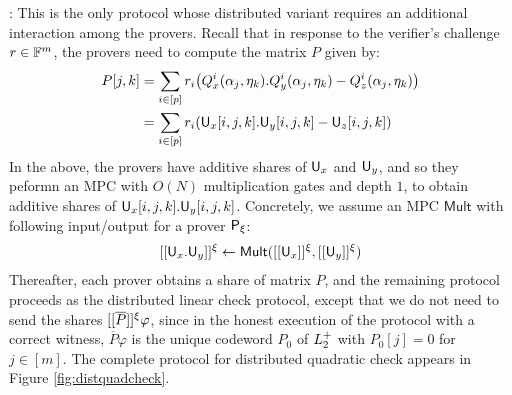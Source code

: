 : This is the only protocol whose
distributed variant requires an additional interaction among the provers. Recall
that in response to the verifier's challenge $r\in \mathbb{F}^m$, the provers need to
compute the matrix $P$ given by: 
\begin{align*}
P[j,k] & =\sum_{i\in
[p]}r_i\big(Q_x^i(\alpha_j,\eta_k).Q_y^i(\alpha_j,\eta_k)-Q_z^i(\alpha_j,\eta_k)\big)
\\
& = \sum_{i\in [p]}r_i(\mathsf{U}_x[i,j,k].\mathsf{U}_y[i,j,k] - \mathsf{U}_z[i,j,k])
\end{align*}
In the above, the provers have additive shares of $\mathsf{U}_x$ and $\mathsf{U}_y$, and
so they peformn an MPC with $O(N)$ multiplication gates and depth $1$, to obtain additive shares of
$\mathsf{U}_x[i,j,k].\mathsf{U}_y[i,j,k]$. Concretely, we assume an MPC $\mathsf{Mult}$
with following input/output for a prover $\mathsf{P}_\xi$: 
\begin{align*}
[[{\mathsf{U}_x.\mathsf{U}_y}]]^\xi\leftarrow \mathsf{Mult}([[{\mathsf{U}_x}]]^\xi,[[{\mathsf{U}_y}]]^\xi)
\end{align*}
Thereafter, each prover obtains a share of matrix $P$, and the remaining
protocol proceeds as the distributed linear check protocol, except that we do
not need to send the shares $[[{\overline{P}}]]^\xi\varphi$, since in the honest
execution of the protocol with a correct witness, $\overline{P}\varphi$ is the
unique codeword $P_0$ of $L^{+}_2$ with $P_0[j]=0$ for $j\in [m]$. The complete
protocol for distributed quadratic check appears in Figure
\ref{fig:distquadcheck}.


